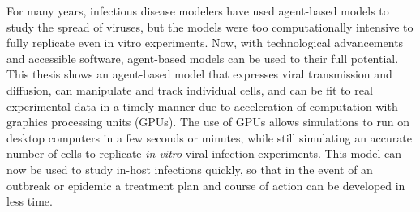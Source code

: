 For many years, infectious disease modelers have used agent-based models to study the spread of viruses, but the models were too computationally intensive to fully replicate even in vitro experiments. Now, with technological advancements and accessible software, agent-based models can be used to their full potential. This thesis shows an agent-based model that expresses viral transmission and diffusion, can manipulate and track individual cells, and can be fit to real experimental data in a timely manner due to acceleration of computation with graphics processing units (GPUs). The use of GPUs allows simulations to run on desktop computers in a few seconds or minutes, while still simulating an accurate number of cells to replicate  \emph{in vitro} viral infection experiments. This model can now be used to study in-host infections quickly, so that in the event of an outbreak or epidemic a treatment plan and course of action can be developed in less time.
